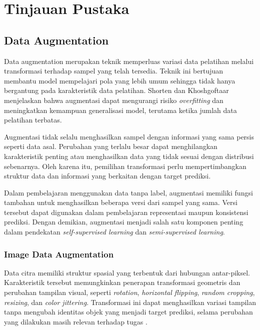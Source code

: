 \setcounter{section}{1}
\section{Tinjauan Pustaka}

\subsection{Data Augmentation}

Data augmentation merupakan teknik memperluas variasi data pelatihan melalui transformasi terhadap sampel yang telah tersedia. Teknik ini bertujuan membantu model mempelajari pola yang lebih umum sehingga tidak hanya bergantung pada karakteristik data pelatihan. Shorten dan Khoshgoftaar \cite{ref1} menjelaskan bahwa augmentasi dapat mengurangi risiko \textit{overfitting} dan meningkatkan kemampuan generalisasi model, terutama ketika jumlah data pelatihan terbatas.

Augmentasi tidak selalu menghasilkan sampel dengan informasi yang sama persis seperti data asal. Perubahan yang terlalu besar dapat menghilangkan karakteristik penting atau menghasilkan data yang tidak sesuai dengan distribusi sebenarnya. Oleh karena itu, pemilihan transformasi perlu mempertimbangkan struktur data dan informasi yang berkaitan dengan target prediksi.

Dalam pembelajaran menggunakan data tanpa label, augmentasi memiliki fungsi tambahan untuk menghasilkan beberapa versi dari sampel yang sama. Versi tersebut dapat digunakan dalam pembelajaran representasi maupun konsistensi prediksi. Dengan demikian, augmentasi menjadi salah satu komponen penting dalam pendekatan \textit{self-supervised learning} dan \textit{semi-supervised learning}.

\subsubsection{Image Data Augmentation}

Data citra memiliki struktur spasial yang terbentuk dari hubungan antar-piksel. Karakteristik tersebut memungkinkan penerapan transformasi geometris dan perubahan tampilan visual, seperti \textit{rotation}, \textit{horizontal flipping}, \textit{random cropping}, \textit{resizing}, dan \textit{color jittering}. Transformasi ini dapat menghasilkan variasi tampilan tanpa mengubah identitas objek yang menjadi target prediksi, selama perubahan yang dilakukan masih relevan terhadap tugas \cite{ref1}.

